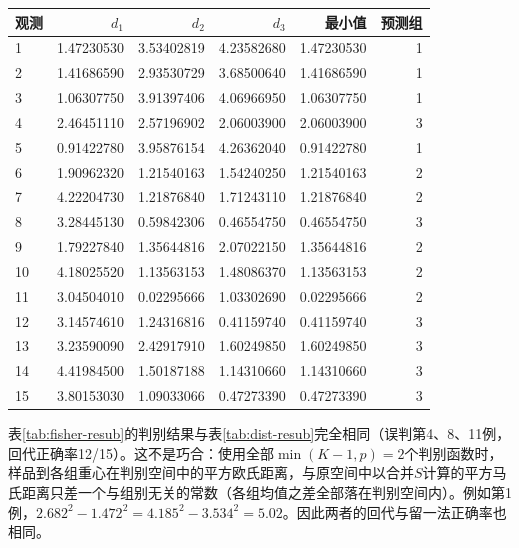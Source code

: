 \par\addvspace{5pt}\begin{center}\begin{minipage}{\linewidth}\centering
\small
{}\label{tab:fisher-resub}
\begin{tabular}{lrrrrr}\toprule
{\bfseries 观测 }&{\bfseries  $d_1$ }&{\bfseries  $d_2$ }&{\bfseries  $d_3$ }&{\bfseries  最小值 }&{\bfseries  预测组}\\\midrule
1 & 1.47230530 & 3.53402819 & 4.23582680 & 1.47230530 & 1\\
2 & 1.41686590 & 2.93530729 & 3.68500640 & 1.41686590 & 1\\
3 & 1.06307750 & 3.91397406 & 4.06966950 & 1.06307750 & 1\\
4 & 2.46451110 & 2.57196902 & 2.06003900 & 2.06003900 & 3\\
5 & 0.91422780 & 3.95876154 & 4.26362040 & 0.91422780 & 1\\
6 & 1.90962320 & 1.21540163 & 1.54240250 & 1.21540163 & 2\\
7 & 4.22204730 & 1.21876840 & 1.71243110 & 1.21876840 & 2\\
8 & 3.28445130 & 0.59842306 & 0.46554750 & 0.46554750 & 3\\
9 & 1.79227840 & 1.35644816 & 2.07022150 & 1.35644816 & 2\\
10 & 4.18025520 & 1.13563153 & 1.48086370 & 1.13563153 & 2\\
11 & 3.04504010 & 0.02295666 & 1.03302690 & 0.02295666 & 2\\
12 & 3.14574610 & 1.24316816 & 0.41159740 & 0.41159740 & 3\\
13 & 3.23590090 & 2.42917910 & 1.60249850 & 1.60249850 & 3\\
14 & 4.41984500 & 1.50187188 & 1.14310660 & 1.14310660 & 3\\
15 & 3.80153030 & 1.09033066 & 0.47273390 & 0.47273390 & 3\\
\bottomrule\end{tabular}
\end{minipage}\end{center}

表\ref{tab:fisher-resub}的判别结果与表\ref{tab:dist-resub}完全相同（误判第4、8、11例，回代正确率12/15）。这不是巧合：使用全部$\min(K-1,p)=2$个判别函数时，样品到各组重心在判别空间中的平方欧氏距离，与原空间中以合并$S$计算的平方马氏距离只差一个与组别无关的常数（各组均值之差全部落在判别空间内）。例如第1例，$2.682^2-1.472^2=4.185^2-3.534^2=5.02$。因此两者的回代与留一法正确率也相同。
